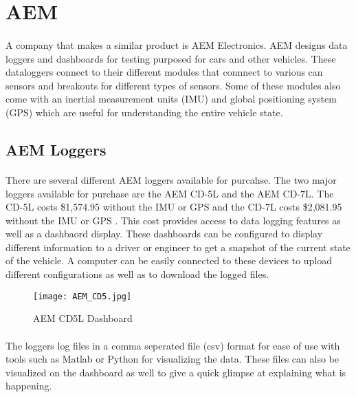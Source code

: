 \section{AEM}

\paragraph{}
A company that makes a similar product is AEM Electronics.
AEM designs data loggers and dashboards for testing purposed for cars and other vehicles.
These dataloggers connect to their different modules that connnect to various can sensors and breakouts for different types of sensors.
Some of these modules also come with an inertial measurement units (IMU) and global positioning system (GPS) which are useful for understanding the entire vehicle state.

\subsection{AEM Loggers}

\paragraph{}
There are several different AEM loggers available for purcahse.
The two major loggers available for purchase are the AEM CD-5L and the AEM CD-7L.
The CD-5L costs \$1,574.95 without the IMU or GPS and the CD-7L costs \$2,081.95 without the IMU or GPS \cite{AEMSite}.
This cost provides access to data logging features as well as a dashbaord display.
These dashboards can be configured to display different information to a driver or engineer to get a snapshot of the current state of the vehicle.
A computer can be easily connected to these devices to upload different configurations as well as to download the logged files.

\begin{figure}[H]
	\centering
	\texttt{[image: AEM\_CD5.jpg]}
	\caption{AEM CD5L Dashboard}
	\label{fig:AEM_CD5}
\end{figure}

\paragraph{}
The loggers log files in a comma seperated file (csv) format for ease of use with tools such as Matlab or Python for visualizing the data.
These files can also be visualized on the dashboard as well to give a quick glimpse at explaining what is happening.

